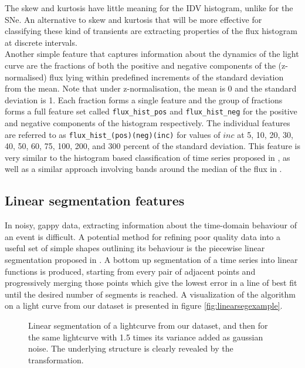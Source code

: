 	The skew and kurtosis have little meaning for the IDV histogram, unlike for the SNe. An alternative to skew and kurtosis that will be more effective for classifying these kind of transients are extracting properties of the flux histogram at discrete intervals.\\
	
	Another simple feature that captures  information about the dynamics of the light curve are the fractions of both the positive and negative components of the (z-normalised) flux lying within predefined increments of the standard deviation from the mean. Note that under z-normalisation, the mean is 0 and the standard deviation is 1. Each fraction forms a single feature and the group of fractions forms a full feature set called \verb#flux_hist_pos# and \verb#flux_hist_neg# for the positive and negative components of the histogram respectively. The individual features are referred to as \verb#flux_hist_(pos)(neg)(inc)# for values of $inc$ at 5, 10, 20, 30, 40, 50, 60, 75, 100, 200, and 300 percent of the standard deviation. This feature is very similar to the histogram based classification of time series proposed in \citet{chen2005using}, as well as a similar approach involving bands around the median of the flux in \citet{richards2011machine}. 
	
	
	\subsection{Linear segmentation features}
	In noisy, gappy data, extracting information about the time-domain behaviour of an event is difficult. A potential method for refining poor quality data into a useful set of simple shapes outlining its behaviour is the piecewise linear segmentation proposed in \citet{keogh2001online}. A bottom up segmentation of a time series into linear functions is produced, starting from every pair of adjacent points and progressively merging those points which give the lowest error in a line of best fit until the desired number of segments is reached. A visualization of the algorithm on a light curve from our dataset is presented in figure \ref{fig:linearsegexample}.
	
	
	\begin{figure}[ht!]
		\centering
		\label{fig:linsegexample}
		\caption{Linear segmentation of a lightcurve from our dataset, and then for the same lightcurve with 1.5 times its variance added as gaussian noise. The underlying structure is clearly revealed by the transformation.}
	\end{figure}
	
